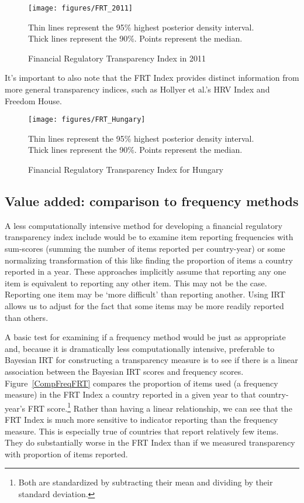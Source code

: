 \documentclass[a4paper]{article}
\begin{document}
\begin{figure}
    \caption{Financial Regulatory Transparency Index in 2011}
    \label{FRT_2011}
    \begin{center}
        \texttt{[image: figures/FRT\_2011]}
    \end{center}
    {\scriptsize{Thin lines represent the 95\% highest posterior density interval. Thick lines represent the 90\%. Points represent the median.}}
\end{figure}

It's important to also note that the FRT Index provides distinct information from more general transparency indices, such as Hollyer et al.'s HRV Index and Freedom House.


\begin{figure}
    \caption{Financial Regulatory Transparency Index for Hungary}
    \label{FRTHungary}
    \begin{center}
        \texttt{[image: figures/FRT\_Hungary]}
    \end{center}
    {\scriptsize{Thin lines represent the 95\% highest posterior density interval. Thick lines represent the 90\%. Points represent the median.}}
\end{figure}

\subsection{Value added: comparison to frequency methods}

A less computationally intensive method for developing a financial regulatory transparency index include would be to examine item reporting frequencies with sum-scores (summing the number of items reported per country-year) or some normalizing transformation of this like finding the proportion of items a country reported in a year. These approaches implicitly assume that reporting any one item is equivalent to reporting any other item. This may not be the case. Reporting one item may be `more difficult' than reporting another. Using IRT allows us to adjust for the fact that some items may be more readily reported than others.

A basic test for examining if a frequency method would be just as appropriate and, because it is dramatically less computationally intensive, preferable to Bayesian IRT for constructing a transparency measure is to see if there is a linear association between the Bayesian IRT scores and frequency scores. Figure~\ref{CompFreqFRT} compares the proportion of items used (a frequency measure) in the FRT Index a country reported in a given year to that country-year's FRT score.\footnote{Both are standardized by subtracting their mean and dividing by their standard deviation.} Rather than having a linear relationship, we can see that the FRT Index is much more sensitive to indicator reporting than the frequency measure. This is especially true of countries that report relatively few items. They do substantially worse in the FRT Index than if we measured transparency with proportion of items reported.
\end{document}
